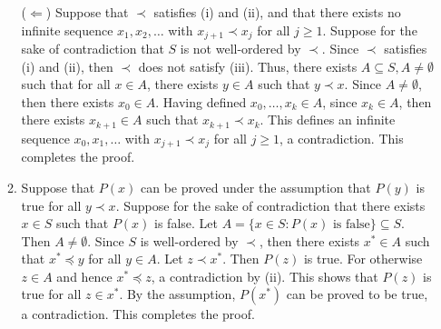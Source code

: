 \documentclass[letterpaper, reqno,11pt]{article}
\begin{document}
\begin{enumerate}
\begin{enumerate}
        ($\Longleftarrow$) Suppose that $\prec$ satisfies (i) and (ii), and that there exists no infinite sequence $x_1, x_2, \ldots$ with $x_{j + 1} \prec x_j$ for all $j \geq 1$. Suppose for the sake of contradiction that $S$ is not well-ordered by $\prec$. Since $\prec$ satisfies (i) and (ii), then $\prec$ does not satisfy (iii). Thus, there exists $A \subseteq S, A \neq \emptyset$ such that for all $x \in A$, there exists $y \in A$ such that $y \prec x$. Since $A \neq \emptyset$, then there exists $x_0 \in A$. Having defined $x_0, \ldots, x_k \in A$, since $x_k \in A$, then there exists $x_{k + 1} \in A$ such that $x_{k + 1} \prec x_k$. This defines an infinite sequence $x_0, x_1, \ldots$ with $x_{j + 1} \prec x_j$ for all $j \geq 1$, a contradiction. This completes the proof.
        \item Suppose that $P(x)$ can be proved under the assumption that $P(y)$ is true for all $y \prec x$. Suppose for the sake of contradiction that there exists $x \in S$ such that $P(x)$ is false. Let $A = \{ x \in S : \text{$P(x)$ is false} \} \subseteq S$. Then $A \neq \emptyset$. Since $S$ is well-ordered by $\prec$, then there exists $x^* \in A$ such that $x^* \preceq y$ for all $y \in A$. Let $z \prec x^*$. Then $P(z)$ is true. For otherwise $z \in A$ and hence $x^* \preceq z$, a contradiction by (ii). This shows that $P(z)$ is true for all $z \in x^*$. By the assumption, $P\left(x^*\right)$ can be proved to be true, a contradiction. This completes the proof.
    \end{enumerate}
\end{enumerate}
\end{document}
